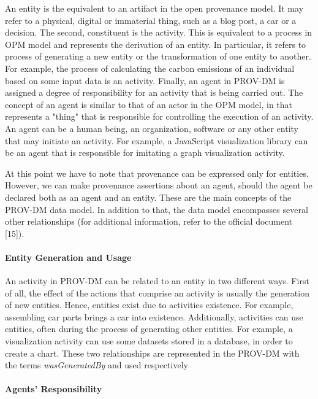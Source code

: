 An entity is the equivalent to an artifact in the open provenance model. It may refer to a physical, digital or immaterial thing, such as a blog post, a car or a decision. The second, constituent is the activity. This is equivalent to a process in OPM model and represents the derivation of an entity. In particular, it refers to process of generating a new entity or the transformation of one entity to another. For example, the process of calculating the carbon emissions of an individual based on some input data is an activity. Finally, an agent in PROV-DM is assigned a degree of responsibility for an activity that is being carried out. The concept of an agent is similar to that of an actor in the OPM model, in that represents a "thing" that is responsible for controlling the execution of an activity. An agent can be a human being, an organization, software or any other entity that may initiate an activity. For example, a JavaScript visualization library can be an agent that is responsible for imitating a graph visualization activity.

At this point we have to note that provenance can be expressed only for entities. However, we can make provenance assertions about an agent, should the agent be declared both as an agent and an entity.
These are the main concepts of the PROV-DM data model. In addition to that, the data model encompasses several other relationships (for additional information, refer to the official document [15]).


\paragraph{Entity Generation and Usage}

An activity in PROV-DM can be related to an entity in two different ways.  First of all, the effect of the actions that comprise an activity is usually the generation of new entities. Hence, entities exist due to activities existence. For example, assembling car parts brings a car into existence. Additionally, activities can use entities, often during the process of generating other entities. For example, a visualization activity can use some datasets stored in a database, in order to create a chart. These two relationships are represented in the PROV-DM with the terms \emph{wasGeneratedBy} and used respectively

\paragraph{Agents' Responsibility}

